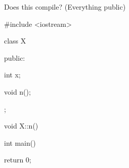 Does this compile? (Everything public)



\begin{consolethree}[escapeinside=||]

#include <iostream>



class X

{

public:

    int x;

    void n();

};



void X::n()

{

}



int main()

{

    return 0;

}

\end{consolethree}

